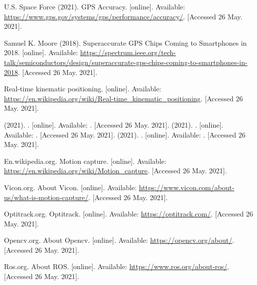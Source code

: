 
 U.S. Space Force (2021). GPS Accuracy. [online]. Available: \url{https://www.gps.gov/systems/gps/performance/accuracy/}. [Accessed 26 May. 2021].

 Samuel K. Moore (2018). Superaccurate GPS Chips Coming to Smartphones in 2018. [online]. Available: \url{https://spectrum.ieee.org/tech-talk/semiconductors/design/superaccurate-gps-chips-coming-to-smartphones-in-2018}. [Accessed 26 May. 2021].

 Real-time kinematic positioning. [online]. Available: \url{https://en.wikipedia.org/wiki/Real-time_kinematic_positioning}. [Accessed 26 May. 2021].

% 
  (2021). . [online]. Available: \url{}. [Accessed 26 May. 2021].
  (2021). . [online]. Available: \url{}. [Accessed 26 May. 2021].
  (2021). . [online]. Available: \url{}. [Accessed 26 May. 2021].



 En.wikipedia.org. Motion capture. [online]. Available: \url{https://en.wikipedia.org/wiki/Motion_capture}. [Accessed 26 May. 2021].

 Vicon.org. About Vicon. [online]. Available: \url{https://www.vicon.com/about-us/what-is-motion-capture/}. [Accessed 26 May. 2021].

 Optitrack.org. Optitrack. [online]. Available: \url{https://optitrack.com/}. [Accessed 26 May. 2021].


 Opencv.org. About Opencv. [online]. Available: \url{https://opencv.org/about/}. [Accessed 26 May. 2021].

 Ros.org. About ROS. [online]. Available: \url{https://www.ros.org/about-ros/}. [Accessed 26 May. 2021].


